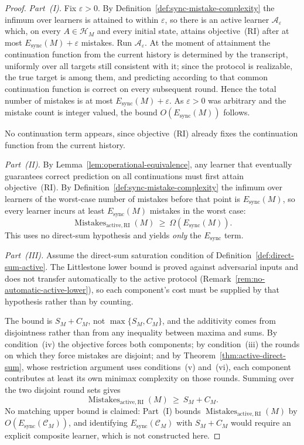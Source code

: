 \documentclass[12pt]{article}
\theoremstyle{definition}
\newcommand{\Esync}{E_{\mathrm{sync}}}
\newcommand{\MistRI}{\operatorname{Mistakes}_{\mathrm{active,RI}}}
\begin{document}
\begin{proof}
\emph{Part~(I).}  Fix $\varepsilon>0$.  By
Definition~\ref{def:sync-mistake-complexity} the infimum over learners is
attained to within $\varepsilon$, so there is an active learner
$\mathcal A_\varepsilon$ which, on every $A\in\mathcal H_M$ and every initial
state, attains objective~(RI) after at most $\Esync(M)+\varepsilon$ mistakes.
Run $\mathcal A_\varepsilon$.  At the moment of attainment the continuation
function from the current history is determined by the transcript, uniformly
over all targets still consistent with it; since the protocol is realizable,
the true target is among them, and predicting according to that common
continuation function is correct on every subsequent round.  Hence the total
number of mistakes is at most $\Esync(M)+\varepsilon$.  As $\varepsilon>0$ was
arbitrary and the mistake count is integer valued, the bound
$O(\Esync(M))$ follows.

No continuation term appears, since objective~(RI) already fixes the
continuation function from the current history.

\emph{Part~(II).}  By Lemma~\ref{lem:operational-equivalence}, any
learner that eventually guarantees correct prediction on all continuations must
first attain objective~(RI).  By
Definition~\ref{def:sync-mistake-complexity} the infimum over learners of the
worst-case number of mistakes before that point is $\Esync(M)$, so every
learner incurs at least $\Esync(M)$ mistakes in the worst case:
\[
\MistRI(M)\ \ge\ \Omega(\Esync(M)).
\]
This uses no direct-sum hypothesis and yields \emph{only} the $\Esync$ term.

\emph{Part~(III).}  Assume the direct-sum saturation condition of
Definition~\ref{def:direct-sum-active}.  The Littlestone lower bound is proved
against adversarial inputs and does not transfer automatically to the active
protocol (Remark~\ref{rem:no-automatic-active-lower}), so each component's
cost must be supplied by that hypothesis rather than by counting.

The bound is $S_M+C_M$, not $\max\{S_M,C_M\}$, and the additivity comes from
disjointness rather than from any inequality between maxima and sums.  By
condition~(iv) the objective forces both components; by condition~(iii) the
rounds on which they force mistakes are disjoint; and by
Theorem~\ref{thm:active-direct-sum}, whose restriction argument uses
conditions~(v) and~(vi), each component contributes at least its own minimax
complexity on those rounds.  Summing over the two disjoint round sets gives
\[
\MistRI(M)\ \ge\ S_M+C_M .
\]
No matching upper bound is claimed: Part~(I) bounds $\MistRI(M)$ by
$O(\Esync(\mathcal C_M))$, and identifying $\Esync(\mathcal C_M)$ with
$S_M+C_M$ would require an explicit composite learner, which is not
constructed here.
\end{proof}
\end{document}
